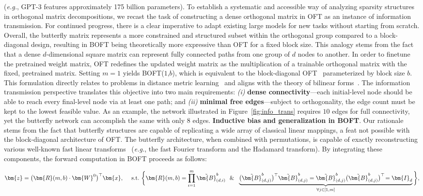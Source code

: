 (\emph{e.g.}, GPT-3 features approximately 175 billion parameters). To establish a systematic and accessible way of analyzing sparsity structures in orthogonal matrix decompositions, we recast the task of constructing a dense orthogonal matrix in OFT as an instance of information transmission. For continued progress, there is a clear imperative to adapt existing large models for new tasks without starting from scratch. Overall, the butterfly matrix represents a more constrained and structured subset within the orthogonal group compared to a block-diagonal design, resulting in BOFT being theoretically more expressive than OFT for a fixed block size. This analogy stems from the fact that a dense $d$-dimensional square matrix can represent fully connected paths from one group of $d$ nodes to another. In order to finetune the pretrained weight matrix, OFT redefines the updated weight matrix as the multiplication of a trainable orthogonal matrix with the fixed, pretrained matrix. Setting $m=1$ yields BOFT($1$,$b$), which is equivalent to the block-diagonal OFT~\cite{qiu2023controlling} parameterized by block size $b$. This formulation directly relates to problems in distance metric learning~\cite{xing2002distance} and aligns with the theory of bilinear forms~\cite{roman2005advanced}. The information transmission perspective translates this objective into two main requirements: \emph{(i)} \textbf{dense connectivity}—each initial-level node should be able to reach every final-level node via at least one path; and \emph{(ii)} \textbf{minimal free edges}—subject to orthogonality, the edge count must be kept to the lowest feasible value. As an example, the network illustrated in Figure~\ref{fig:info_trans} requires $10$ edges for full connectivity, yet the butterfly network can accomplish the same with only $8$ edges. \textbf{Inductive bias and generalization in BOFT}. Our rationale stems from the fact that butterfly structures are capable of replicating a wide array of classical linear mappings, a feat not possible with the block-diagonal architecture of OFT. The butterfly architecture, when combined with permutations, is capable of exactly reconstructing various well-known fast linear transforms~\cite{dao2019learning,dao2019kaleidoscope} (\emph{e.g.}, the fast Fourier transform and the Hadamard transform). By integrating these components, the forward computation in BOFT proceeds as follows:

\begin{equation}
    \begin{aligned}\nonumber
    \bm{z}=\big(\bm{R}(m,b)\cdot\bm{W}^0\big)^\top\bm{x},~~~~\text{s.t.}~\bigg{\{}\bm{R}(m,b)=\prod_{i=1}^m \tilde{\bm{B}}^b_{(d,i)}~~\&~~\underbrace{\big(\tilde{\bm{B}}^b_{(d,j)}\big)^\top\tilde{\bm{B}}^b_{(d,j)}=\tilde{\bm{B}}^b_{(d,j)}\big(\tilde{\bm{B}}^b_{(d,j)}\big)^\top\!=\bm{I}_d}_{\forall j\in [1, m]}\bigg{\}},
    \end{aligned}
\end{equation}

